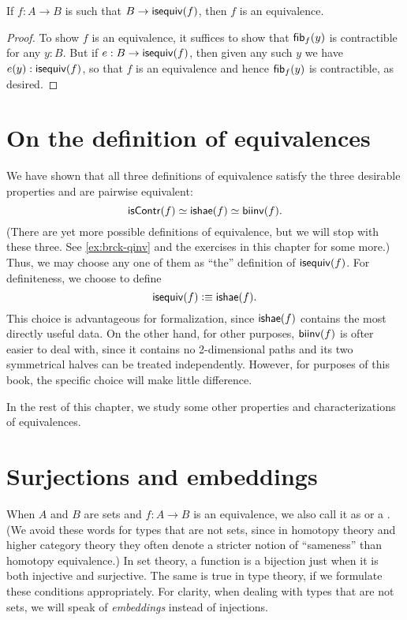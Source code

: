 \begin{cor}\label{thm:equiv-inhabcod}
  If $f:A\to B$ is such that $B\to \mathsf{isequiv}(f)$, then $f$ is an equivalence.
\end{cor}
\begin{proof}
  To show $f$ is an equivalence, it suffices to show that ${\mathsf{fib}}_{f}(y)$ is contractible for any $y:B$.
  But if $e:B\to \mathsf{isequiv}(f)$, then given any such $y$ we have $e(y):\mathsf{isequiv}(f)$, so that $f$ is an equivalence and hence ${\mathsf{fib}}_{f}(y)$ is contractible, as desired.
\end{proof}


\section{On the definition of equivalences}
\label{sec:concluding-remarks}

We have shown that all three definitions of equivalence satisfy the three desirable properties and are pairwise equivalent:
\[ \mathsf{isContr}(f) \simeq \mathsf{ishae}(f) \simeq \mathsf{biinv}(f) . \]
(There are yet more possible definitions of equivalence, but we will stop with these three.
See \autoref{ex:brck-qinv} and the exercises in this chapter for some more.)
Thus, we may choose any one of them as ``the'' definition of $\mathsf{isequiv} (f)$.
For definiteness, we choose to define
\[ \mathsf{isequiv}(f) \vcentcolon\equiv \mathsf{ishae}(f).\]
This choice is advantageous for formalization, since $\mathsf{ishae}(f)$ contains the most directly useful data.
On the other hand, for other purposes, $\mathsf{biinv}(f)$ is ofter easier to deal with, since it contains no 2-dimensional paths and its two symmetrical halves can be treated independently.
However, for purposes of this book, the specific choice will make little difference.

In the rest of this chapter, we study some other properties and characterizations of equivalences.


\section{Surjections and embeddings}
\label{sec:mono-surj}

When $A$ and $B$ are sets and $f:A\to B$ is an equivalence, we also call it as  or a .
(We avoid these words for types that are not sets, since in homotopy theory and higher category theory they often denote a stricter notion of ``sameness'' than homotopy equivalence.)
In set theory, a function is a bijection just when it is both injective and surjective.
The same is true in type theory, if we formulate these conditions appropriately.
For clarity, when dealing with types that are not sets, we will speak of \emph{embeddings} instead of injections.

